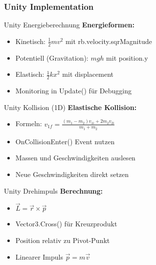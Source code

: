\subsubsection{Unity Implementation}

\begin{concept}{Unity Energieberechnung}
    \textbf{Energieformen:}
    \begin{itemize}
        \item Kinetisch: $\frac{1}{2}mv^2$ mit rb.velocity.sqrMagnitude
        \item Potentiell (Gravitation): $mgh$ mit position.y
        \item Elastisch: $\frac{1}{2}kx^2$ mit displacement
        \item Monitoring in Update() für Debugging
    \end{itemize}
\end{concept}

\begin{concept}{Unity Kollision (1D)}
    \textbf{Elastische Kollision:}
    \begin{itemize}
        \item Formeln: $v_{1f} = \frac{(m_1-m_2)v_{1i} + 2m_2v_{2i}}{m_1+m_2}$
        \item OnCollisionEnter() Event nutzen
        \item Massen und Geschwindigkeiten auslesen
        \item Neue Geschwindigkeiten direkt setzen
    \end{itemize}
\end{concept}

\begin{concept}{Unity Drehimpuls}
    \textbf{Berechnung:}
    \begin{itemize}
        \item $\vec{L} = \vec{r} \times \vec{p}$
        \item Vector3.Cross() für Kreuzprodukt
        \item Position relativ zu Pivot-Punkt
        \item Linearer Impuls $\vec{p} = m\vec{v}$
    \end{itemize}
\end{concept}

\multend

